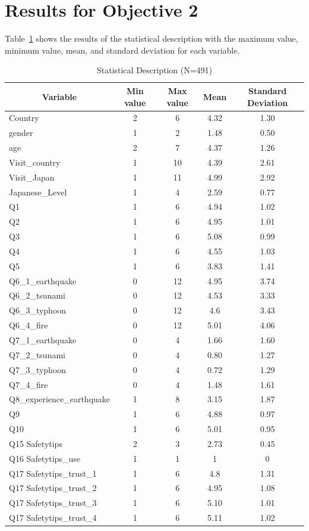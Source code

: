 \section{Results for Objective 2 }
Table~\ref{table27} shows the results of the statistical description with the maximum value, minimum value, mean, and standard deviation for each variable.

\begin{table}[h]
  \caption[Statistical Description]{Statistical Description (N=491)}
  \label{table27}
  \centering
  \begin{tabular}{l|cccc}
 \hline
\multicolumn{1}{c|}{Variable} & Min value  & Max value & Mean & Standard Deviation \\
 \hline
Country	& 2&6&4.32&1.30\\
gender&1&2&1.48&0.50\\
age&2&7&4.37&1.26\\
Visit\_country&1&10&4.39&2.61\\
Visit\_Japan&1&11&4.99&2.92\\
Japanese\_Level&1&4&2.59&0.77\\
Q1&1&6&4.94&1.02\\
Q2&1&6&4.95&1.01\\
Q3&1&6&5.08&0.99\\
Q4&1&6&4.55&1.03\\
Q5&1&6&3.83&1.41\\
Q6\_1\_earthquake&0&12&4.95&3.74\\
Q6\_2\_tsunami&0&12&4.53&3.33\\
Q6\_3\_typhoon&0&12&4.6&3.43\\
Q6\_4\_fire&0&12&5.01&4.06\\
Q7\_1\_earthquake&0&4&1.66&1.60\\
Q7\_2\_tsunami&0&4&0.80&1.27\\
Q7\_3\_typhoon&0&4&0.72&1.29\\
Q7\_4\_fire&0&4&1.48&1.61\\
Q8\_experience\_earthquake&1&8&3.15& 1.87\\
Q9&1&6&4.88&0.97\\
Q10	&1&6&5.01&0.95\\
Q15 Safetytips&2&3&2.73&0.45\\
Q16 Safetytips\_use&1&1&1&0\\
Q17 Safetytips\_trust\_1&1&6&4.8&1.31\\
Q17 Safetytips\_trust\_2&1&6&4.95&1.08\\
Q17 Safetytips\_trust\_3&1&6&5.10&1.01\\
Q17 Safetytips\_trust\_4&1&6&5.11&1.02\\
 \hline
  \end{tabular}
\end{table}

